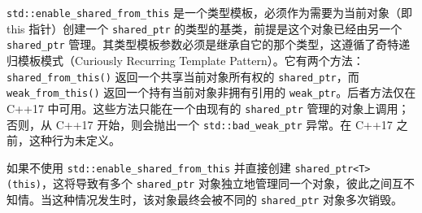 \verb|std::enable_shared_from_this| 是一个类型模板，必须作为需要为当前对象（即 this 指针）创建一个 \verb|shared_ptr| 的类型的基类，前提是这个对象已经由另一个 \verb|shared_ptr| 管理。其类型模板参数必须是继承自它的那个类型，这遵循了奇特递归模板模式（Curiously Recurring Template Pattern）。它有两个方法：\verb|shared_from_this()| 返回一个共享当前对象所有权的 \verb|shared_ptr|，而 \verb|weak_from_this()| 返回一个持有当前对象非拥有引用的 \verb|weak_ptr|。后者方法仅在 C++17 中可用。这些方法只能在一个由现有的 \verb|shared_ptr| 管理的对象上调用；否则，从 C++17 开始，则会抛出一个 \verb|std::bad_weak_ptr| 异常。在 C++17 之前，这种行为未定义。

如果不使用 \verb|std::enable_shared_from_this| 并直接创建 \verb|shared_ptr<T>(this)|，这将导致有多个 \verb|shared_ptr| 对象独立地管理同一个对象，彼此之间互不知情。当这种情况发生时，该对象最终会被不同的 \verb|shared_ptr| 对象多次销毁。

